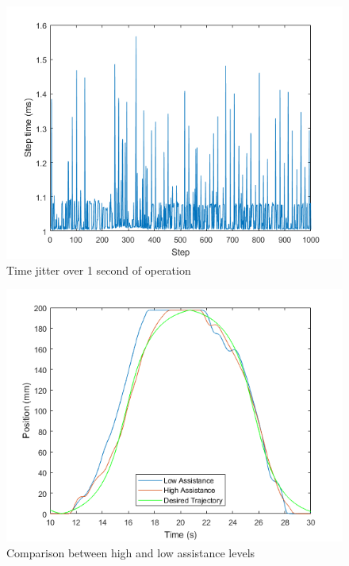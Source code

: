 \documentclass[12pt]{report}
\begin{document}
\begin{figure}[t] 
	\centering
	\includegraphics[width=0.9\linewidth]{time_jitter}
	\caption{Time jitter over 1 second of operation}
	\label{fig:jitter}
\end{figure}

\begin{figure}[t] 
	\centering
	\includegraphics[width=0.9\linewidth]{position_comp}
	\caption{Comparison between high and low assistance levels}
	\label{fig:VerInt}
\end{figure}
\end{document}
